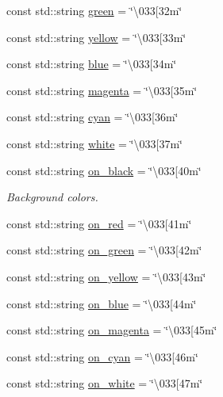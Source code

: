 \begin{DoxyCompactItemize}
const std\+::string \hyperlink{classspdlog_1_1sinks_1_1ansicolor__sink_ab762e65612c98bbc6b264fb4b042fc9c}{green} = \char`\"{}\textbackslash{}033\mbox{[}32m\char`\"{}
\item 
const std\+::string \hyperlink{classspdlog_1_1sinks_1_1ansicolor__sink_a2677f9c054be6ae2a2e673a92ba27189}{yellow} = \char`\"{}\textbackslash{}033\mbox{[}33m\char`\"{}
\item 
const std\+::string \hyperlink{classspdlog_1_1sinks_1_1ansicolor__sink_aa5f719a0fe17fe167d2c90e65173865d}{blue} = \char`\"{}\textbackslash{}033\mbox{[}34m\char`\"{}
\item 
const std\+::string \hyperlink{classspdlog_1_1sinks_1_1ansicolor__sink_a9a665375cbfd2c7ab4a07004df386fce}{magenta} = \char`\"{}\textbackslash{}033\mbox{[}35m\char`\"{}
\item 
const std\+::string \hyperlink{classspdlog_1_1sinks_1_1ansicolor__sink_a6b2e0a6f8d365e054a255b631c4d4046}{cyan} = \char`\"{}\textbackslash{}033\mbox{[}36m\char`\"{}
\item 
const std\+::string \hyperlink{classspdlog_1_1sinks_1_1ansicolor__sink_a74514f96774a00d0a7300b7a625c5044}{white} = \char`\"{}\textbackslash{}033\mbox{[}37m\char`\"{}
\item 
const std\+::string \hyperlink{classspdlog_1_1sinks_1_1ansicolor__sink_ac887dfeac8f16dbd96128398333786f5}{on\+\_\+black} = \char`\"{}\textbackslash{}033\mbox{[}40m\char`\"{}
\begin{DoxyCompactList}\small\item\em Background colors. \end{DoxyCompactList}\item 
const std\+::string \hyperlink{classspdlog_1_1sinks_1_1ansicolor__sink_aa66893db05fcfebc131c66b7db30ea49}{on\+\_\+red} = \char`\"{}\textbackslash{}033\mbox{[}41m\char`\"{}
\item 
const std\+::string \hyperlink{classspdlog_1_1sinks_1_1ansicolor__sink_addc3addb0060ca767421a4a3149c4747}{on\+\_\+green} = \char`\"{}\textbackslash{}033\mbox{[}42m\char`\"{}
\item 
const std\+::string \hyperlink{classspdlog_1_1sinks_1_1ansicolor__sink_a7450ec0f85ad82c7830b11e1f54f1606}{on\+\_\+yellow} = \char`\"{}\textbackslash{}033\mbox{[}43m\char`\"{}
\item 
const std\+::string \hyperlink{classspdlog_1_1sinks_1_1ansicolor__sink_a8b4b2900e0db2ed81b1d87531c75db70}{on\+\_\+blue} = \char`\"{}\textbackslash{}033\mbox{[}44m\char`\"{}
\item 
const std\+::string \hyperlink{classspdlog_1_1sinks_1_1ansicolor__sink_a0cf149033d141e033f2ffb4b239f84f6}{on\+\_\+magenta} = \char`\"{}\textbackslash{}033\mbox{[}45m\char`\"{}
\item 
const std\+::string \hyperlink{classspdlog_1_1sinks_1_1ansicolor__sink_a628bbe153b16a66b33566608794b82fc}{on\+\_\+cyan} = \char`\"{}\textbackslash{}033\mbox{[}46m\char`\"{}
\item 
const std\+::string \hyperlink{classspdlog_1_1sinks_1_1ansicolor__sink_ab42fb978ba2ad9d004bf31903f0d0edc}{on\+\_\+white} = \char`\"{}\textbackslash{}033\mbox{[}47m\char`\"{}
\end{DoxyCompactItemize}
